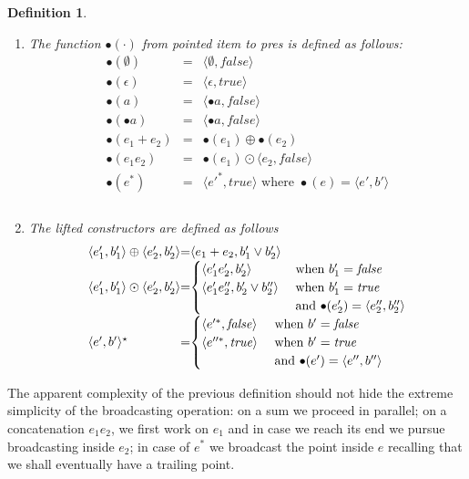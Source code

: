 \documentclass[preprint]{sigplanconf}
\newcommand{\true}{\mathit{true}}
\newcommand{\false}{\mathit{false}}
\newcommand{\varoast}{\star}
\newcounter{item}
\newtheorem{definition}[item]{Definition}
\begin{document}
\begin{definition}\ \label{def:bullet}
\begin{enumerate}
\item The function $\bullet(\cdot)$ from pointed item to pres is defined as
follows:
\[
\begin{array}{rcl}
\bullet(\emptyset)&=& \langle \emptyset,\false \rangle\\
\bullet(\epsilon) &=& \langle \epsilon,\true\rangle\\
\bullet(a) &=& \langle \bullet a,\false\rangle\\
\bullet(\bullet a) &=& \langle \bullet a,\false\rangle\\
\bullet(e_1 + e_2) &=& \bullet(e_1) \oplus \bullet(e_2) \\
\bullet(e_1e_2) &=& \bullet(e_1) \odot \langle e_2, \false \rangle\\
\bullet(e^*) &=& \langle e'^*,\true \rangle \mbox{ where }
\bullet(e) = \langle e',b'\rangle\\ \\ 
\end{array}
\]
\item The lifted constructors are defined as follows
\[
\begin{array}{l@{=}l}
\langle e'_1,b_1' \rangle \oplus \langle e'_2,b_2' \rangle & \langle e_1 + e_2, b_1'\vee b_2' \rangle \\
\langle e'_1,b_1' \rangle \odot \langle e'_2,b_2' \rangle & \begin{cases} \langle e_1'e_2', b_2' \rangle & \mbox{ when $b_1' = \false$}
 \\ \langle e_1'e_2'',b_2' \vee b_2'' \rangle & \mbox{ when $b_1' = \true$} \\ \quad & \mbox{ and
  $\bullet(e_2') = \langle e_2'',b_2'' \rangle$} \end{cases} \\
\langle e',b' \rangle^\varoast &
 \begin{cases}
   \langle e'^*, \false \rangle & \mbox{ when $b' = \false$ } \\
   \langle e''^*, \true \rangle & \mbox{ when $b' = \true$ } \\
                               & \mbox{ and $\bullet(e') = \langle e'',b''\rangle$}
 \end{cases}
\end{array}
\]
\end{enumerate}
\end{definition}

\noindent 
The apparent complexity of the previous definition should not 
hide the extreme simplicity of the broadcasting operation: on a sum we
proceed in parallel; on a concatenation $e_1e_2$, we first work on
$e_1$ and in case we reach its end we pursue broadcasting inside
$e_2$; in case of $e^*$ we broadcast the point inside $e$ recalling
that we shall eventually have a trailing point. 
\end{document}

